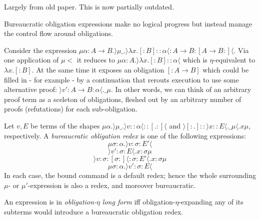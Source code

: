 \documentclass{article}
\begin{document}
\begin{oldpart}{Largely from old paper. This is now partially outdated.}
\begin{definition}
    \begin{grammar}
      \otherform{[\sigma:]}{}
    \end{grammar}
  \end{definition}

  Bureaucratic obligation expressions make no logical progress but instead manage the control flow around obligations.

  \begin{example}
    Consider the expression $\mu \alpha:A \rightarrow B.\rangle \mu\_.\rangle \lambda x. [:B] :: \alpha \langle :A\rightarrow B: [A \rightarrow B:]\langle$. Via one application of $\mu <$ it reduces to $\mu \alpha:A.\rangle \lambda x.[:B]:: \alpha \langle$ which is $\eta$-equivalent to $\lambda x.[:B]$. At the same time it exposes an obligation $[:A \rightarrow B]$ which could be filled in - for example - by a continuation that rerouts execution to use some alternative proof: $\rangle v' :A\rightarrow B: \alpha\langle.\_\mu$. In other words, we can think of an arbitrary proof term as a sceleton of obligations, fleshed out by an arbitrary number of proofs (refutations) for each sub-obligation.
  \end{example}

  \begin{definition}
    Let $v,E$ be terms of the shapes  $\mu \alpha.\rangle \mu \_.\rangle v::\alpha\langle :: [.:] \langle$ and $ \rangle [:.] :: \rangle x:: E\langle .\_\mu\langle .x\mu$, respectively. A  \emph{bureaucratic obligation redex} is one of the following expressions:
    \[
      \mu \sigma:\alpha.\rangle  v :\sigma: E' \langle
    \]
    \[
      \rangle v' :\sigma: E \langle.x : \sigma \mu
    \]
    \[
      \rangle v :\sigma: [\sigma:] \langle :\sigma: E' \langle.x: \sigma \mu
    \]
    \[
      \mu \sigma:\alpha.\rangle v' :\sigma: E \langle
    \]
    In each case, the bound command is a default redex; hence the whole surrounding $\mu$- or $\mu'$-expression is also a redex, and moreover bureaucratic.
  \end{definition}

  \begin{definition}
    An expression is in \emph{obligation-$\eta$ long form} iff obligation-$\eta$-expanding any of its subterms would introduce a bureaucratic obligation redex.
  \end{definition}


\end{oldpart}
\end{document}
